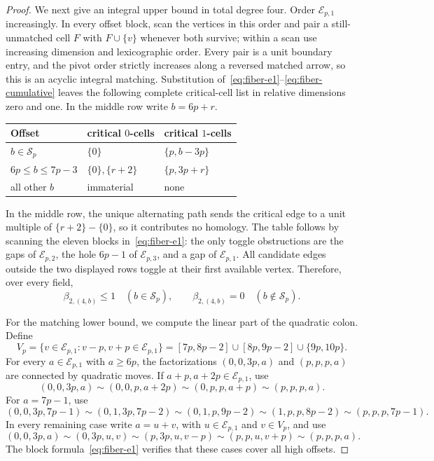 \documentclass[11pt]{article}
\theoremstyle{definition}
\theoremstyle{remark}
\begin{document}
\begin{proof}
We next give an integral upper bound in total degree four. Order
\(\mathcal E_{p,1}\) increasingly. In every offset block, scan the vertices in this order and
pair a still-unmatched cell \(F\) with \(F\cup\{v\}\) whenever both survive; within a scan use
increasing dimension and lexicographic order. Every pair is a unit boundary entry, and the pivot
order strictly increases along a reversed matched arrow, so this is an acyclic integral matching.
Substitution of~\eqref{eq:fiber-e1}--\eqref{eq:fiber-cumulative} leaves the following complete
critical-cell list in relative dimensions zero and one. In the middle row write \(b=6p+r\).
\begin{center}
\begin{tabular}{@{}lll@{}}
\toprule
Offset & critical $0$-cells & critical $1$-cells\\
\midrule
$b\in\mathcal S_p$ & $\{0\}$ & $\{p,b-3p\}$\\
$6p\le b\le7p-3$ & $\{0\},\{r+2\}$ & $\{p,3p+r\}$\\
all other $b$ & immaterial & none\\
\bottomrule
\end{tabular}
\end{center}
In the middle row, the unique alternating path sends the critical edge to a unit multiple of
\(\{r+2\}-\{0\}\), so it contributes no homology. The table follows by scanning the eleven
blocks in~\eqref{eq:fiber-e1}: the only toggle obstructions are the gaps of
\(\mathcal E_{p,2}\), the hole \(6p-1\) of \(\mathcal E_{p,3}\), and a gap of
\(\mathcal E_{p,1}\). All candidate edges outside the two displayed rows toggle at their first
available vertex. Therefore, over every field,
\begin{equation}
\beta_{2,(4,b)}\le1\quad(b\in\mathcal S_p),
\qquad
\beta_{2,(4,b)}=0\quad(b\notin\mathcal S_p).
\label{eq:relative-upper}
\end{equation}

For the matching lower bound, we compute the linear part of the quadratic colon. Define
\[
V_p=\{v\in\mathcal E_{p,1}:v-p,v+p\in\mathcal E_{p,1}\}
=[7p,8p-2]\cup[8p,9p-2]\cup\{9p,10p\}.
\]
For every \(a\in\mathcal E_{p,1}\) with \(a\ge6p\), the factorizations
\((0,0,3p,a)\) and \((p,p,p,a)\) are connected by quadratic moves. If
\(a+p,a+2p\in\mathcal E_{p,1}\), use
\[
(0,0,3p,a)\sim(0,0,p,a+2p)\sim(0,p,p,a+p)\sim(p,p,p,a).
\]
For \(a=7p-1\), use
\[
(0,0,3p,7p-1)\sim(0,1,3p,7p-2)\sim(0,1,p,9p-2)
\sim(1,p,p,8p-2)\sim(p,p,p,7p-1).
\]
In every remaining case write \(a=u+v\), with
\(u\in\mathcal E_{p,1}\) and \(v\in V_p\), and use
\[
(0,0,3p,a)\sim(0,3p,u,v)\sim(p,3p,u,v-p)
\sim(p,p,u,v+p)\sim(p,p,p,a).
\]
The block formula~\eqref{eq:fiber-e1} verifies that these cases cover all high offsets.


\end{proof}
\end{document}
